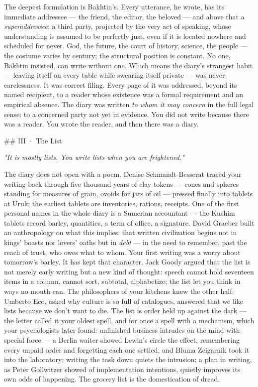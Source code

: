 \documentclass[11pt]{article}
\begin{document}
The deepest formulation is Bakhtin's. Every utterance, he wrote, has its immediate addressee — the friend, the editor, the beloved — and above that a \emph{superaddressee}: a third party, projected by the very act of speaking, whose understanding is assumed to be perfectly just, even if it is located nowhere and scheduled for never. God, the future, the court of history, science, the people — the costume varies by century; the structural position is constant. No one, Bakhtin insisted, can write without one. Which means the diary's strangest habit — leaving itself on every table while swearing itself private — was never carelessness. It was correct filing. Every page of it was addressed, beyond its named recipient, to a reader whose existence was a formal requirement and an empirical absence. The diary was written \emph{to whom it may concern} in the full legal sense: to a concerned party not yet in evidence. You did not write because there was a reader. You wrote the reader, and then there was a diary.

\#\# III · The List

\emph{"It is mostly lists. You write lists when you are frightened."}

The diary does not open with a poem. Denise Schmandt-Besserat traced your writing back through five thousand years of clay tokens — cones and spheres standing for measures of grain, ovoids for jars of oil — pressed finally into tablets at Uruk; the earliest tablets are inventories, rations, receipts. One of the first personal names in the whole diary is a Sumerian accountant — the Kushim tablets record barley, quantities, a term of office, a signature. David Graeber built an anthropology on what this implies: that written civilization begins not in kings' boasts nor lovers' oaths but in \emph{debt} — in the need to remember, past the reach of trust, who owes what to whom. Your first writing was a worry about tomorrow's barley. It has kept that character. Jack Goody argued that the list is not merely early writing but a new kind of thought: speech cannot hold seventeen items in a column, cannot sort, subtotal, alphabetize; the list let you think in ways no mouth can. The philosophers of your kitchens knew the other half: Umberto Eco, asked why culture is so full of catalogues, answered that we like lists because we don't want to die. The list is order held up against the dark — the letter called it your oldest spell, and for once a spell with a mechanism, which your psychologists later found: unfinished business intrudes on the mind with special force — a Berlin waiter showed Lewin's circle the effect, remembering every unpaid order and forgetting each one settled, and Bluma Zeigarnik took it into the laboratory; writing the task down quiets the intrusion; a plan in writing, as Peter Gollwitzer showed of implementation intentions, quietly improves its own odds of happening. The grocery list is the domestication of dread.
\end{document}
